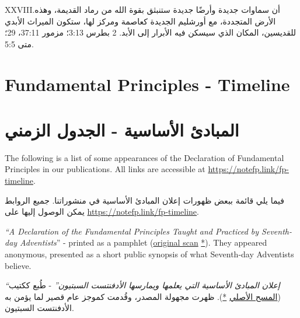 \lettrine{XXVIII.} أن سماوات جديدة وأرضًا جديدة ستنبثق بقوة الله من رماد القديمة، وهذه الأرض المتجددة، مع أورشليم الجديدة كعاصمة ومركز لها، ستكون الميراث الأبدي للقديسين، المكان الذي سيسكن فيه الأبرار إلى الأبد. 2 بطرس 3:13؛ مزمور 37:11، 29؛ متى 5:5.


\section*{Fundamental Principles - Timeline} \label{appendix:timeline}


\section*{المبادئ الأساسية - الجدول الزمني} \label{appendix:timeline}


The following is a list of some appearances of the Declaration of Fundamental Principles in our publications. All links are accessible at \href{https://notefp.link/fp-timeline}{https://notefp.link/fp-timeline}.


فيما يلي قائمة ببعض ظهورات إعلان المبادئ الأساسية في منشوراتنا. جميع الروابط يمكن الوصول إليها على \href{https://notefp.link/fp-timeline}{https://notefp.link/fp-timeline}.






\textit{“A Declaration of the Fundamental Principles Taught and Practiced by Seventh-day Adventists}” - printed as a pamphlet (\href{https://adventistdigitallibrary.org/islandora/object/adl:366607?link_only=true}{original scan} \href{https://forgotten-pillar.s3.us-east-2.amazonaws.com/A+declaration+of+the+fundamental+principles+taught+and+practiced+by+the+Seventh-day+Adventists++.pdf}{*}). They appeared anonymous, presented as a short public synopsis of what Seventh-day Adventists believe.


\textit{“إعلان المبادئ الأساسية التي يعلمها ويمارسها الأدفنتست السبتيون”} - طُبع ككتيب (\href{https://adventistdigitallibrary.org/islandora/object/adl:366607?link_only=true}{المسح الأصلي} \href{https://forgotten-pillar.s3.us-east-2.amazonaws.com/A+declaration+of+the+fundamental+principles+taught+and+practiced+by+the+Seventh-day+Adventists++.pdf}{*}). ظهرت مجهولة المصدر، وقُدمت كموجز عام قصير لما يؤمن به الأدفنتست السبتيون.






